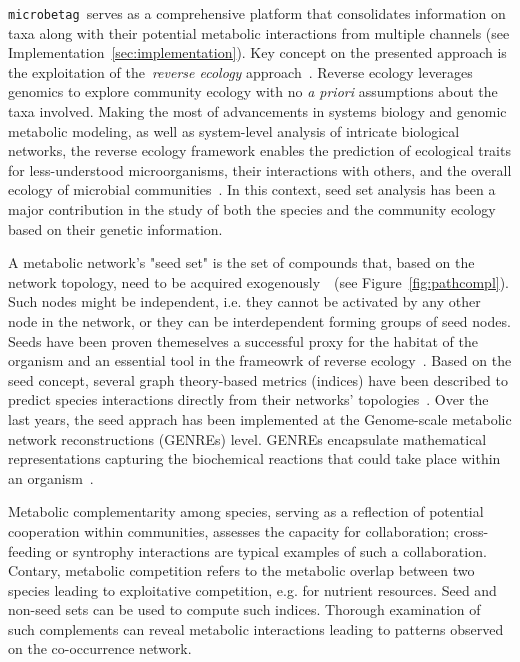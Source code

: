 \documentclass[sn-mathphys,Numbered, lineno]{sn-jnl}  %
\theoremstyle{thmstyleone}%
\theoremstyle{thmstyletwo}%
\theoremstyle{thmstylethree}%
\newcommand{\microbetag}{\texttt{microbetag }}
\begin{document}
    \microbetag serves as a comprehensive platform that consolidates information on taxa along with their potential metabolic interactions from multiple channels 
    (see Implementation~\ref{sec:implementation}).
    Key concept on the presented approach is the exploitation of the~\textit{reverse ecology} approach~\cite{levy2012reverse}.
    Reverse ecology leverages genomics to explore community ecology with no \textit{a priori} assumptions about the taxa involved.
    Making the most of advancements in systems biology and genomic metabolic modeling, as well as system-level analysis of intricate biological networks, the reverse ecology framework enables the prediction of ecological traits for less-understood microorganisms, their interactions with others, and the overall ecology of microbial communities~\cite{levy2014metagenomic}.
    In this context, seed set analysis has been a major contribution in the study of both the species and the community ecology based on their genetic information.

    A metabolic network's "seed set" is the set of compounds that, based on the network topology, need to be acquired exogenously~\cite{borenstein2008large}~(see Figure~\ref{fig:pathcompl}).
    Such nodes might be independent, i.e. they cannot be activated by any other node in the network, or they can be interdependent forming groups of seed nodes.
    Seeds have been proven themeselves a successful proxy for the habitat of the organism and an essential tool in the frameowrk of reverse ecology~\cite{parter2007environmental,borenstein2008large}.
    Based on the seed concept, several graph theory-based metrics (indices) have been described to predict species interactions directly from their networks' topologies~\cite{levy2015netcooperate, kreimer2012netcmpt, zelezniak2015metabolic, belcour2020metage2metabo}.
    Over the last years, the seed apprach has been implemented at the Genome-scale metabolic network reconstructions (GENREs) level.
    GENREs encapsulate mathematical representations capturing the biochemical reactions that could take place within an organism~\cite{thiele2010protocol, durot2008genome, communityGemMicrobiomeModel2023}.

    Metabolic complementarity among species, serving as a reflection of potential cooperation within communities, assesses the capacity for collaboration; cross-feeding or syntrophy interactions are typical examples of such a collaboration. 
    Contary, metabolic competition refers to the metabolic overlap between two species leading to exploitative competition, e.g. for nutrient resources.
    Seed and non-seed sets can be used to compute such indices. 
    Thorough examination of such complements can reveal metabolic interactions leading to patterns observed on the co-occurrence network.
    
\end{document}
